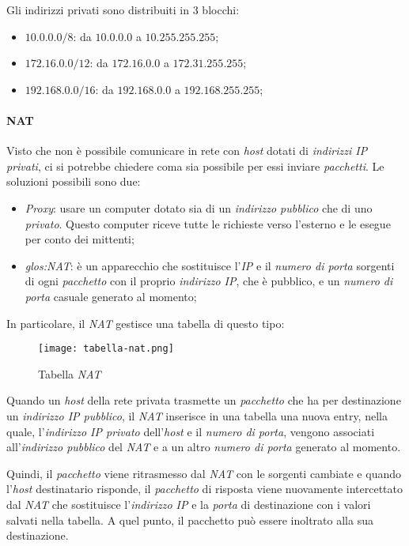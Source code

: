 Gli indirizzi privati sono distribuiti in 3 blocchi:
\begin{itemize}
    \item $10.0.0.0/8$: da $10.0.0.0$ a $10.255.255.255$;
    \item $172.16.0.0/12$: da $172.16.0.0$ a $172.31.255.255$;
    \item $192.168.0.0/16$: da $192.168.0.0$ a $192.168.255.255$;
\end{itemize}

\paragraph{NAT}
Visto che non è possibile comunicare in rete con \emph{host} dotati di
\emph{indirizzi IP privati}, ci si potrebbe chiedere coma sia possibile per essi
inviare \emph{pacchetti}. Le soluzioni possibili sono due:
\begin{itemize}
    \item \emph{Proxy}: usare un computer dotato sia di un \emph{indirizzo
    pubblico} che di uno \emph{privato}. Questo computer riceve tutte le richieste
    verso l'esterno e le esegue per conto dei mittenti;
    \item \emph{\gls{glos:NAT}}: è un apparecchio che sostituisce l'\emph{IP} e
    il \emph{numero di porta} sorgenti di ogni \emph{pacchetto} con il proprio
    \emph{indirizzo IP}, che è pubblico, e un \emph{numero di porta} casuale
    generato al momento; 
\end{itemize}\noindent
In particolare, il \emph{NAT} gestisce una tabella di questo tipo:

\begin{figure}[h!]
    \centering
    \texttt{[image: tabella-nat.png]}
    \caption{Tabella \emph{NAT}}
\end{figure}\noindent
Quando un \emph{host} della rete privata trasmette un \emph{pacchetto} che ha
per destinazione un \emph{indirizzo IP pubblico}, il \emph{NAT} inserisce in una
tabella una nuova entry, nella quale, l'\emph{indirizzo IP privato}
dell'\emph{host} e il \emph{numero di porta}, vengono associati all'\emph{indirizzo
pubblico} del \emph{NAT} e a un altro \emph{numero di porta} generato al momento.

Quindi, il \emph{pacchetto} viene ritrasmesso dal \emph{NAT} con le sorgenti
cambiate e quando l'\emph{host} destinatario risponde, il \emph{pacchetto} di
risposta viene nuovamente intercettato dal \emph{NAT} che sostituisce
l'\emph{indirizzo IP} e la \emph{porta} di destinazione con i valori salvati nella
tabella. A quel punto, il pacchetto può essere inoltrato alla sua destinazione.

